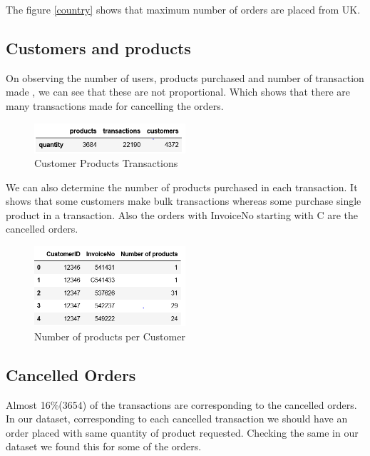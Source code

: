 The figure \ref{country} shows that maximum number of orders are placed from UK.

\subsection*{Customers and products}

On observing the number of users, products purchased and number of transaction made , we can see that these are not proportional. Which shows that there are many transactions made for cancelling the orders.\\

\begin{figure}[h]
\caption{Customer Products Transactions}
\label{2.1}
\centering
\includegraphics[width=0.5\textwidth]{images/2_1.PNG}
\end{figure}

We can also determine the number of products purchased in each transaction. It shows that some customers make bulk transactions whereas some purchase single product in a transaction.
Also the orders with InvoiceNo starting with C are the cancelled orders.

\begin{figure}[h]
\caption{Number of products per Customer}
\label{2.2}
\centering
\includegraphics[width=0.5\textwidth]{images/2_2.PNG}
\end{figure}

\subsection*{Cancelled Orders}

Almost 16\%(3654) of the transactions are corresponding to the cancelled orders. In our dataset, corresponding to each cancelled transaction we should have an order placed with same quantity of product requested. Checking the same in our dataset we found this for some of the orders.\\

